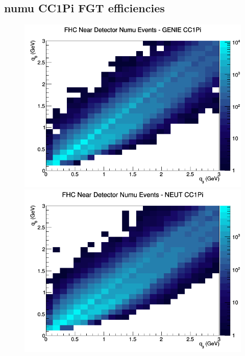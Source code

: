 \documentclass[12pt]{article}
\begin{document}
\subsection{numu CC1Pi FGT efficiencies}
\begin{figure}[h]
\includegraphics[width=\linewidth]{eff_q0_q3/FGT/CC1Pi_FHC_ND_numu_q3_q0_GENIE.png}
\endminipage
{}
\includegraphics[width=\linewidth]{eff_q0_q3/FGT/CC1Pi_FHC_ND_numu_q3_q0_NEUT.png}
\endminipage
{}

\end{figure}
\end{document}
